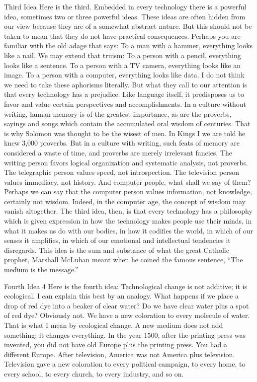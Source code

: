 Third Idea
Here is the third. Embedded in every technology there is a powerful idea, sometimes two or three powerful
ideas. These ideas are often hidden from our view because they are of a somewhat abstract nature. But this
should not be taken to mean that they do not have practical consequences.
Perhaps you are familiar with the old adage that says: To a man with a hammer, everything looks like a nail.
We may extend that truism: To a person with a pencil, everything looks like a sentence. To a person with a
TV camera, everything looks like an image. To a person with a computer, everything looks like data. I do
not think we need to take these aphorisms literally. But what they call to our attention is that every
technology has a prejudice. Like language itself, it predisposes us to favor and value certain perspectives
and accomplishments. In a culture without writing, human memory is of the greatest importance, as are the
proverbs, sayings and songs which contain the accumulated oral wisdom of centuries. That is why Solomon
was thought to be the wisest of men. In Kings I we are told he knew 3,000 proverbs. But in a culture with
writing, such feats of memory are considered a waste of time, and proverbs are merely irrelevant fancies.
The writing person favors logical organization and systematic analysis, not proverbs. The telegraphic
person values speed, not introspection. The television person values immediacy, not history. And computer
people, what shall we say of them? Perhaps we can say that the computer person values information, not
knowledge, certainly not wisdom. Indeed, in the computer age, the concept of wisdom may vanish
altogether.
The third idea, then, is that every technology has a philosophy which is given expression in how the
technology makes people use their minds, in what it makes us do with our bodies, in how it codifies the
world, in which of our senses it amplifies, in which of our emotional and intellectual tendencies it
disregards. This idea is the sum and substance of what the great Catholic prophet, Marshall McLuhan
meant when he coined the famous sentence, “The medium is the message.”


Fourth Idea
4
Here is the fourth idea: Technological change is not additive; it is ecological. I can explain this best by an
analogy. What happens if we place a drop of red dye into a beaker of clear water? Do we have clear water
plus a spot of red dye? Obviously not. We have a new coloration to every molecule of water. That is what I
mean by ecological change. A new medium does not add something; it changes everything. In the year
1500, after the printing press was invented, you did not have old Europe plus the printing press. You had a
different Europe. After television, America was not America plus television. Television gave a new
coloration to every political campaign, to every home, to every school, to every church, to every industry,
and so on.

